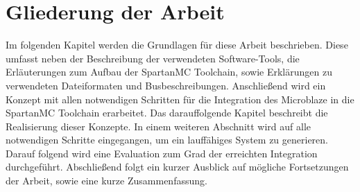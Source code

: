 \section{Gliederung der Arbeit}
Im folgenden Kapitel werden die Grundlagen für diese Arbeit beschrieben. Diese umfasst neben der Beschreibung der verwendeten Software-Tools, die Erläuterungen zum
Aufbau der SpartanMC Toolchain, sowie Erklärungen zu verwendeten Dateiformaten und Busbeschreibungen. Anschließend wird ein Konzept mit allen notwendigen Schritten 
für die Integration des Microblaze in die SpartanMC Toolchain erarbeitet. Das darauffolgende Kapitel beschreibt die Realisierung dieser Konzepte. In einem weiteren 
Abschnitt wird auf alle notwendigen Schritte eingegangen, um ein lauffähiges System zu generieren. Darauf folgend wird eine Evaluation zum Grad der erreichten Integration
durchgeführt. Abschließend folgt ein kurzer Ausblick auf mögliche Fortsetzungen der Arbeit, sowie eine kurze Zusammenfassung.

